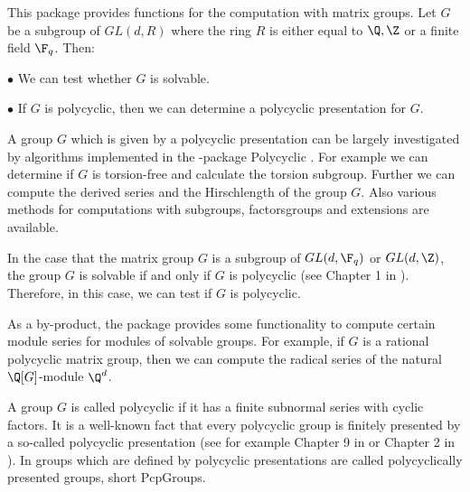 


This package provides functions for the computation with matrix
groups. Let $G$ be a subgroup of $GL(d,R)$ where the ring $R$ is
either equal to $\Q,\Z$ or a finite field $\F_q$.
Then: 
 \smallskip
{\parindent=25pt
\item{$\bullet$} 
    We can test whether $G$ is solvable.
 \smallskip
\item{$\bullet$}
    If $G$ is polycyclic, then we can determine a polycyclic
    presentation for $G$. 
    \smallskip
}
\smallskip

A group $G$ which is given by a polycyclic presentation can be largely
investigated by algorithms implemented in the {\GAP}-package
Polycyclic \cite{polycyclic}. For example 
we can determine if $G$ is torsion-free
and calculate the torsion subgroup. Further we can compute the derived
series and the Hirschlength of the group $G$. Also various methods for
computations with subgroups, factorsgroups and extensions are
available.

In the case that the matrix group 
$G$ is a subgroup of $GL(d,\F_q)$ or $GL(d,\Z)$, the
group $G$ is solvable if and only if $G$ is polycyclic (see Chapter 1
in \cite{Segal}). 
Therefore, in this case, we can test if $G$ is polycyclic. 

As a by-product, the {\Polenta} package 
provides some functionality to compute certain module series for
modules of solvable groups. For example, if
$G$ is a rational polycyclic matrix group, then we can compute the 
radical series of the natural
$\Q[G]$-module $\Q^d$.  


A group $G$ is called polycyclic if it has a finite subnormal
series with cyclic 
factors. It is a well-known fact that every polycyclic group is
finitely presented by a so-called polycyclic presentation (see
for example Chapter 9 in \cite{Sims} or Chapter 2 in \cite{polycyclic} ). 
In {\GAP} groups which are defined by polycyclic
 presentations are called
polycyclically presented groups, short PcpGroups.
 
